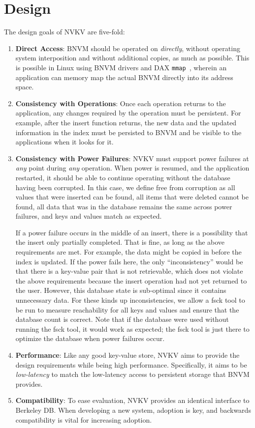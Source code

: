 \section{Design}

The design goals of NVKV are five-fold:
\begin{enumerate}
	\item \textbf{Direct Access}: BNVM should be operated on \textit{directly},
		without operating system interposition and without additional copies, as
		much as possible. This is possible in Linux using BNVM drivers and DAX
		\texttt{mmap}~\cite{dax}, wherein an application can memory map the
		actual BNVM directly into its address space.
	\item \textbf{Consistency with Operations}: Once each operation returns to
		the application, any changes required by the operation must be
		persistent. For example, after the insert function returns, the new data
		and the updated information in the index must be persisted to BNVM and
		be visible to the applications when it looks for it.
	\item \textbf{Consistency with Power Failures}: NVKV must support power
		failures at \textit{any} point during \textit{any} operation. When power
		is resumed, and the application restarted, it should be able to continue
		operating without the database having been corrupted. In this case, we
		define free from corruption as all values that were inserted can be
		found, all items that were deleted cannot be found, all data that was in
		the database remains the same across power failures, and keys and values
		match as expected.

		If a power failure occurs in the middle of an insert, there is a
		possibility that the insert only partially completed. That is fine, as
		long as the above requirements are met. For example, the data might be
		copied in before the index is updated. If the power fails here, the only
		``inconsistency'' would be that there is a key-value pair that is not
		retrievable, which does not violate the above requirements because the
		insert operation had not yet returned to the user. However, this
		database state is sub-optimal since it contains unnecessary data. For
		these kinds up inconsistencies, we allow a fsck tool to be run to
		measure reachability for all keys and values and ensure that the
		database count is correct. Note that if the database were used without
		running the fsck tool, it would work as expected; the fsck tool is just
		there to optimize the database when power failures occur.
	\item \textbf{Performance}: Like any good key-value store, NVKV aims to
		provide the design requirements while being high performance.
		Specifically, it aims to be \textit{low-latency} to match the
		low-latency access to persistent storage that BNVM provides.
	\item \textbf{Compatibility}: To ease evaluation, NVKV provides an identical
		interface to Berkeley DB. When developing a new system, adoption is key,
		and backwards compatibility is vital for increasing adoption.
\end{enumerate}

